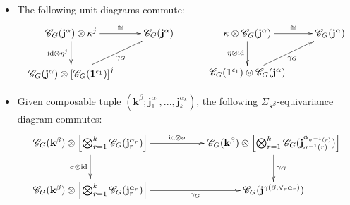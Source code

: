 \documentclass{article}
\begin{document}
\begin{defn}
\begin{itemize}
\begin{align*}
{                && \mathscr{C}_G(\mathbf{i}^{\gamma^2})\\
                \mathscr{C}_G(\mathbf{k}^\delta)\tensor \left[\bigtensor_{r=1}^k\left[
                    \mathscr{C}_G(\mathbf{j}_r^{\beta_r})\tensor\left(\bigtensor_{r=1}^{j_r}\mathscr{C}_G(\mathbf{i}_{r,s}^{\alpha_{r,s}})\right)
                \right]\right] \ar[rr]_-{\id\tensor (\gamma_G)^k} && \mathscr{C}_G(\mathbf{k}^\delta)\tensor \left[\bigtensor_{r=1}^k \mathscr{C}_G(\mathbf{h}_r^{\gamma(\beta_r;\vee_s \alpha_{r,s})})\right] \ar[u]_-{\gamma_G}
            }
        \end{align*}
        Here, $\gamma^2:=\gamma\left(\gamma(\delta;\vee_r\beta_r);\bigvee_r\left(\vee_s \alpha_{r,s}\right)\right) = \gamma\left(\delta;\bigvee_r \gamma(\beta_r;\vee_s\alpha_{r,s})\right)$ based on \textbf{Proposition 3.4}.

        \hfil

        \item[(b)] The following unit diagrams commute:
        \begin{align*}
            \xymatrix{
                \mathscr{C}_G(\mathbf{j}^\alpha)\tensor \kappa^j \ar[r]^-{\cong} \ar[d]_-{\id\tensor \eta^j} & \mathscr{C}_G(\mathbf{j}^\alpha)\\
                \mathscr{C}_G(\mathbf{j}^\alpha)\tensor \left[\mathscr{C}_G(\mathbf{1}^{\epsilon_1})\right]^j \ar[ur]_-{\gamma_G}
            }\quad\quad\quad \xymatrix{
                \kappa\tensor \mathscr{C}_G(\mathbf{j}^\alpha) \ar[d]_-{\eta\tensor \id} \ar[r]^-{\cong} & \mathscr{C}_G(\mathbf{j}^\alpha)\\
                \mathscr{C}_G(\mathbf{1}^{\epsilon_1})\tensor \mathscr{C}_G(\mathbf{j}^\alpha) \ar[ur]_-{\gamma_G}
            }
        \end{align*}

        \hfil

        \item[(c)] Given composable tuple $(\mathbf{k}^\beta;\mathbf{j}_1^{\alpha_1},...,\mathbf{j}_k^{\alpha_k})$, the following $\Sigma_{\mathbf{k}^\beta}$-equivariance diagram commutes:
        \begin{align*}
            \xymatrix{
                \mathscr{C}_G(\mathbf{k}^\beta)\tensor\left[\bigtensor_{r=1}^k \mathscr{C}_G(\mathbf{j}_r^{\alpha_r})\right] \ar[d]_-{\sigma\tensor \id} \ar[rr]^-{\id\tensor \sigma} && \mathscr{C}_G(\mathbf{k}^\beta)\tensor\left[\bigtensor_{r=1}^k \mathscr{C}_G(\mathbf{j}_{\sigma^{-1}(r)}^{\alpha_{\sigma^{-1}(r)}})\right] \ar[d]^-{\gamma_G}\\
                \mathscr{C}_G(\mathbf{k}^\beta)\tensor\left[\bigtensor_{r=1}^k \mathscr{C}_G(\mathbf{j}_r^{\alpha_r})\right] \ar[rr]_-{\gamma_G} && \mathscr{C}_G(\mathbf{j}^{\gamma(\beta;\vee_r\alpha_r)})
            }
        \end{align*}


\end{itemize}
\end{defn}
\end{document}
